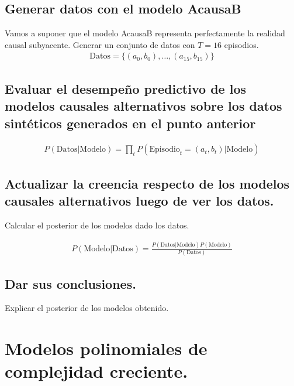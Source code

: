 \documentclass[a4paper,10pt]{article}
\begin{document}
\subsection{Generar datos con el modelo AcausaB}

Vamos a suponer que el modelo AcausaB representa perfectamente la realidad causal subyacente.
Generar un conjunto de datos con $T = 16$ episodios.
\begin{align*}
\text{Datos} = \{(a_0, b_0), \dots, (a_{15}, b_{15})  \}
\end{align*}

\subsection{Evaluar el desempeño predictivo de los modelos causales alternativos sobre los datos sintéticos generados en el punto anterior}
\begin{align*}
P(\text{Datos}|\text{Modelo}) = \prod_t P(\text{Episodio}_t = (a_t,b_t)|\text{Modelo})
\end{align*}

\subsection{Actualizar la creencia respecto de los modelos causales alternativos luego de ver los datos.}

Calcular el posterior de los modelos dado los datos.

\begin{align*}
P(\text{Modelo}|\text{Datos}) =  \frac{P(\text{Datos}|\text{Modelo})P(\text{Modelo}) }{P(\text{Datos})}
\end{align*}

\subsection{Dar sus conclusiones.}

Explicar el posterior de los modelos obtenido.


\section{Modelos polinomiales de complejidad creciente.}
\end{document}
